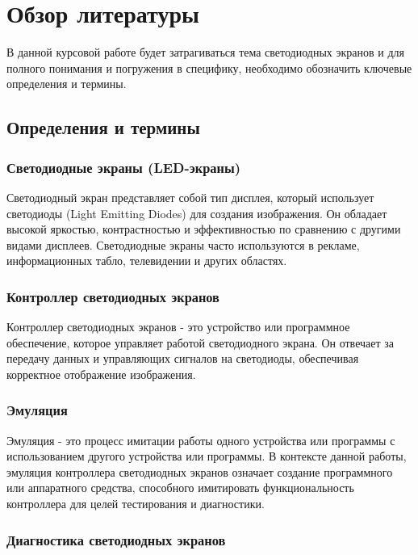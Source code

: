 \section{Обзор литературы}
\label{sec:literature}
В данной курсовой работе будет затрагиваться тема светодиодных экранов и для полного понимания и погружения в специфику, необходимо обозначить ключевые определения и термины.
\subsection{Определения и термины}

\subsubsection{Светодиодные экраны (LED-экраны)}

Светодиодный экран представляет собой тип дисплея, который использует светодиоды (Light Emitting Diodes) для создания изображения. Он обладает высокой яркостью, контрастностью и эффективностью по сравнению с другими видами дисплеев. Светодиодные экраны часто используются в рекламе, информационных табло, телевидении и других областях.

\subsubsection{Контроллер светодиодных экранов}

Контроллер светодиодных экранов - это устройство или программное обеспечение, которое управляет работой светодиодного экрана. Он отвечает за передачу данных и управляющих сигналов на светодиоды, обеспечивая корректное отображение изображения.

\subsubsection{Эмуляция}

Эмуляция - это процесс имитации работы одного устройства или программы с использованием другого устройства или программы. В контексте данной работы, эмуляция контроллера светодиодных экранов означает создание программного или аппаратного средства, способного имитировать функциональность контроллера для целей тестирования и диагностики.

\subsubsection{Диагностика светодиодных экранов}

